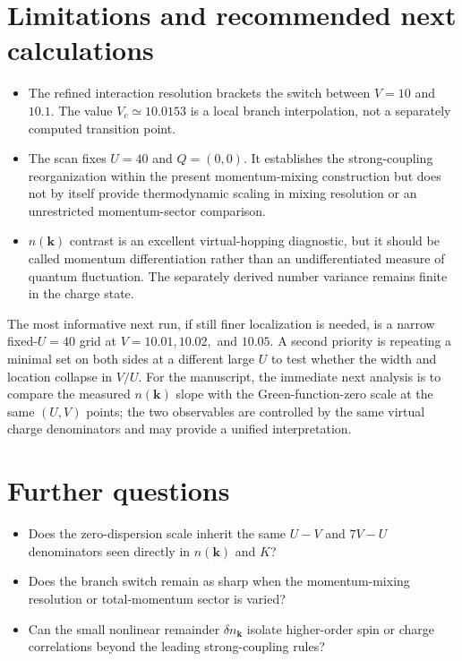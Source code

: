 \documentclass[10pt]{article}
\newcommand{\vk}{\mathbf{k}}
\begin{document}
\section{Limitations and recommended next calculations}

\begin{itemize}
\item The refined interaction resolution brackets the switch between $V=10$ and
$10.1$.  The value $V_c\simeq 10.0153$ is a local branch interpolation, not a separately
computed transition point.
\item The scan fixes $U=40$ and $Q=(0,0)$.  It establishes the strong-coupling
reorganization within the present momentum-mixing construction but does not by
itself provide thermodynamic scaling in mixing resolution or an unrestricted
momentum-sector comparison.
\item $n(\vk)$ contrast is an excellent virtual-hopping diagnostic, but it should be
called momentum differentiation rather than an undifferentiated measure of quantum
fluctuation.  The separately derived number variance remains finite in the charge
state.
\end{itemize}

The most informative next run, if still finer localization is needed, is a narrow
fixed-$U=40$ grid at $V=10.01,10.02,$ and $10.05$.  A second priority
is repeating a minimal set on both sides at a different large $U$ to test whether the
width and location collapse in $V/U$.  For the manuscript, the immediate next analysis
is to compare the measured $n(\vk)$ slope with the Green-function-zero scale at the
same $(U,V)$ points; the two observables are controlled by the same virtual charge
denominators and may provide a unified interpretation.

\section*{Further questions}
\begin{itemize}
\item Does the zero-dispersion scale inherit the same $U-V$ and $7V-U$ denominators
seen directly in $n(\vk)$ and $K$?
\item Does the branch switch remain as sharp when the momentum-mixing resolution or
total-momentum sector is varied?
\item Can the small nonlinear remainder $\delta n_{\vk}$ isolate higher-order spin
or charge correlations beyond the leading strong-coupling rules?
\end{itemize}
\end{document}
